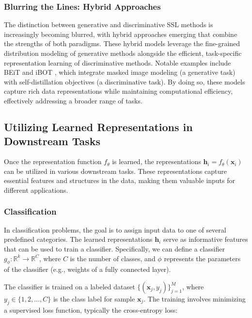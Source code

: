 \subsubsection{Blurring the Lines: Hybrid Approaches}

The distinction between generative and discriminative SSL methods is increasingly becoming blurred, with hybrid approaches emerging that combine the strengths of both paradigms. These hybrid models leverage the fine-grained distribution modeling of generative methods alongside the efficient, task-specific representation learning of discriminative methods. Notable examples include BEiT \citep{bao2021beit} and iBOT \citep{zhou2022ibot}, which integrate masked image modeling (a generative task) with self-distillation objectives (a discriminative task). By doing so, these models capture rich data representations while maintaining computational efficiency, effectively addressing a broader range of tasks.

\subsection{Utilizing Learned Representations in Downstream Tasks}

Once the representation function \( f_{\theta} \) is learned, the representations \( \mathbf{h}_i = f_{\theta}(\mathbf{x}_i) \) can be utilized in various downstream tasks. These representations capture essential features and structures in the data, making them valuable inputs for different applications.

\subsubsection{Classification}

In classification problems, the goal is to assign input data to one of several predefined categories. The learned representations \( \mathbf{h}_i \) serve as informative features that can be used to train a classifier. Specifically, we can define a classifier \( g_{\phi} : \mathbb{R}^k \rightarrow \mathbb{R}^C \), where \( C \) is the number of classes, and \( \phi \) represents the parameters of the classifier (e.g., weights of a fully connected layer).

The classifier is trained on a labeled dataset \( \{ (\mathbf{x}_j, y_j) \}_{j=1}^M \), where \( y_j \in \{1, 2, \dots, C\} \) is the class label for sample \( \mathbf{x}_j \). The training involves minimizing a supervised loss function, typically the cross-entropy loss:

